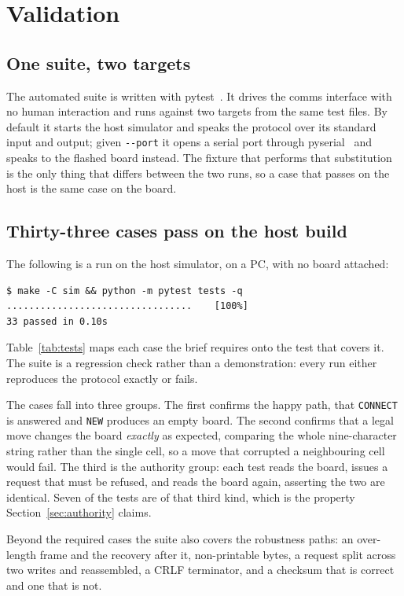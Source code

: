 \section{Validation}
\label{sec:valid}

\subsection{One suite, two targets}
The automated suite is written with pytest~\cite{pytest}. It drives the comms
interface with no human interaction and runs against two targets from the same
test files. By default it starts the host
simulator and speaks the protocol over its standard input and output; given
\texttt{-{}-port} it opens a serial port through pyserial~\cite{pyserial} and
speaks to the flashed board instead. The fixture that performs that substitution is the only thing that
differs between the two runs, so a case that passes on the host is the same case
on the board.

\subsection{Thirty-three cases pass on the host build}
The following is a run on the host simulator, on a PC, with no board attached:

{\footnotesize
\begin{verbatim}
$ make -C sim && python -m pytest tests -q
.................................    [100%]
33 passed in 0.10s
\end{verbatim}}

Table~\ref{tab:tests} maps each case the brief requires onto the test that
covers it. The suite is a regression check rather than a demonstration: every
run either reproduces the protocol exactly or fails.

The cases fall into three groups. The first confirms the happy path, that
\texttt{CONNECT} is answered and \texttt{NEW} produces an empty board. The
second confirms that a legal move changes the board \emph{exactly} as expected,
comparing the whole nine-character string rather than the single cell, so a move
that corrupted a neighbouring cell would fail. The third is the authority group:
each test reads the board, issues a request that must be refused, and reads the
board again, asserting the two are identical. Seven of the tests are of that
third kind, which is the property Section~\ref{sec:authority} claims.

Beyond the required cases the suite also covers the robustness paths: an
over-length frame and the recovery after it, non-printable bytes, a request
split across two writes and reassembled, a CRLF terminator, and a checksum that
is correct and one that is not.

